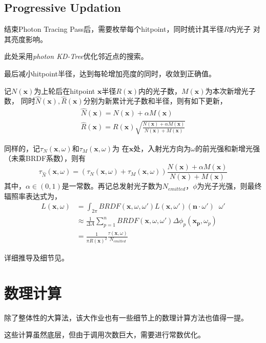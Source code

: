 \documentclass[a4paper,12pt]{article}
\theoremstyle{plain}
\numberwithin{thmdef}{section}
\begin{document}
\subsection{Progressive Updation}
结束Photon Tracing Pass后，需要枚举每个hitpoint，同时统计其半径$R$内光子%
对其亮度影响。\par
此处采用\textit{photon KD-Tree}优化邻近点的搜索。\par
最后减小hitpoint半径，达到每轮增加亮度的同时，收敛到正确值。\par
记$N(\mathbf{x})$为上轮后在hitpoint $\mathbf{x}$半径$R(\mathbf{x})$内的光子数，$M(\mathbf{x})$为本次新增光子数，%
同时$\hat{N}(\mathbf{x}),\hat{R}(\mathbf{x})$分别为新累计光子数和半径，则有如下更新，
\begin{gather}
\hat{N}(\mathbf{x})=N(\mathbf{x})+\alpha M(\mathbf{x})\\
\hat{R}(\mathbf{x})=R(\mathbf{x})\sqrt{\frac{N(\mathbf{x})+\alpha M(\mathbf{x})}{N(\mathbf{x})+M(\mathbf{x})}}
\end{gather}\par
同样的，记$\tau_{N}(\mathbf{x},\omega)$和$\tau_{M}(\mathbf{x},\omega)$为%
在$\mathbf{x}$处，入射光方向为$\omega$的前光强和新增光强（未乘BRDF系数），则有
\begin{equation}
\tau_{\hat{N}}(\mathbf{x},\omega)=(\tau_N(\mathbf{x},\omega)+\tau_M(\mathbf{x},\omega))%
\frac{N(\mathbf{x})+\alpha M(\mathbf{x})}{N(\mathbf{x})+M(\mathbf{x})}
\end{equation}
其中，$\alpha\in(0,1)$是一常数。再记总发射光子数为$N_{emitted}$，$\phi$为光子光强，则最终辐照率表达式为，
\begin{align}
L(\mathbf{x},\omega)
&=\int_{2\pi}BRDF(\mathbf{x},\omega,\omega')L(\mathbf{x},\omega')%
(\mathbf{n}\cdot\omega')\mathop(d\!)\omega'\\
&\approx \frac{1}{\Delta A}\sum_{p=1}^{n}BRDF(\mathbf{x},\omega,%
\omega')\Delta\phi_p(\mathbf{x_p},\omega_p)\\
&=\frac{1}{\pi R(\mathbf{x})^2}\frac{\tau(\mathbf{x},\omega)}{N_{emitted}}
\end{align}\par
详细推导及细节见\cite{ppm}。
\section{数理计算}
除了整体性的大算法，该大作业也有一些细节上的数理计算方法也值得一提。\par
这些计算虽然底层，但由于调用次数巨大，需要进行常数优化。\par
\end{document}
